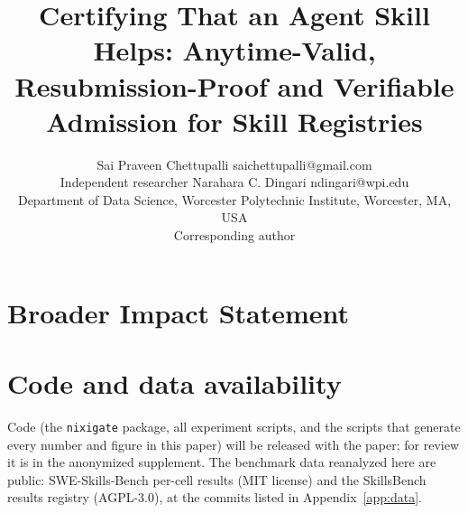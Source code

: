 \documentclass[10pt]{article}
\title{Certifying That an Agent Skill Helps: Anytime-Valid, Resubmission-Proof and Verifiable Admission for Skill Registries}
\author{\name Sai Praveen Chettupalli \email saichettupalli@gmail.com\\
      \addr Independent researcher
      \AND
      \name Narahara C. Dingari \email ndingari@wpi.edu \\
      \addr Department of Data Science, Worcester Polytechnic Institute, Worcester, MA, USA\\
      \addr Corresponding author}
\begin{document}
\maketitle

\begin{abstract}

\end{abstract}










\section*{Broader Impact Statement}


\section*{Code and data availability}
Code (the \texttt{nixigate} package, all experiment scripts, and the scripts that generate every number and figure in this paper) will be released with the paper; for review it is in the anonymized supplement. The benchmark data reanalyzed here are public: SWE-Skills-Bench per-cell results (MIT license) and the SkillsBench results registry (AGPL-3.0), at the commits listed in Appendix~\ref{app:data}.




\appendix





\end{document}
